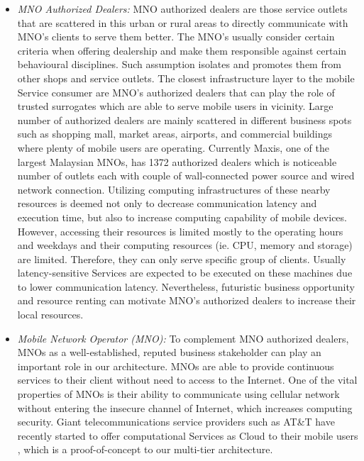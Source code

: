 \documentclass[conference]{IEEEtran}
\begin{document}
\begin{itemize}
\item{\textit{MNO Authorized Dealers:}}
MNO authorized dealers are those service outlets that are scattered in this urban or rural areas to directly communicate with MNO's clients to serve them better. The MNO's usually consider certain criteria when offering dealership and make them responsible against certain behavioural disciplines. Such assumption isolates and promotes them from other shops and service outlets. The closest infrastructure layer to the mobile Service consumer are MNO's authorized dealers that can play the role of trusted surrogates which are able to serve mobile users in vicinity. Large number of authorized dealers are mainly scattered in different business spots such as shopping mall, market areas, airports, and commercial buildings where plenty of mobile users are operating. Currently Maxis, one of the largest Malaysian MNOs, has 1372 authorized dealers \cite{Maxisdealer} which is noticeable number of outlets each with couple of wall-connected power source and wired network connection. Utilizing computing infrastructures of these nearby resources is deemed not only to decrease communication latency and execution time, but also to increase computing capability of mobile devices. However, accessing their resources is limited mostly to the operating hours and weekdays and their computing resources (ie. CPU, memory and storage) are limited. Therefore, they can only serve specific group of clients. Usually latency-sensitive Services are expected to be executed on these machines due to lower communication latency. Nevertheless, futuristic business opportunity and resource renting can motivate MNO's authorized dealers to increase their local resources.

\item{\textit{Mobile Network Operator (MNO):}}
To complement MNO authorized dealers, MNOs as a well-established, reputed business stakeholder can play an important role in our architecture. MNOs are able to provide continuous services to their client without need to access to the Internet. One of the vital properties of MNOs is their ability to communicate using cellular network without entering the insecure channel of Internet, which increases computing security. Giant telecommunications service providers such as AT\&T have recently started to offer computational Services as Cloud to their mobile users \cite{att}, which is a proof-of-concept to our multi-tier architecture. 


\end{itemize}
\end{document}
